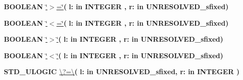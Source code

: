 \begin{DoxyCompactItemize}
\item 
{\bfseries {\bfseries \textcolor{comment}{B\+O\+O\+L\+E\+A\+N}\textcolor{vhdlchar}{ }}} \hyperlink{classfixed__pkg_a4cd07e388cdbb3996dd11f56781d3758}{\char`\"{}$>$=\char`\"{}}{\bfseries  ( }{\bfseries \textcolor{vhdlchar}{l\+: }\textcolor{stringliteral}{in }{\bfseries \textcolor{comment}{I\+N\+T\+E\+G\+E\+R}\textcolor{vhdlchar}{ }}}{\bfseries  , \textcolor{vhdlchar}{r\+: }\textcolor{stringliteral}{in }\textcolor{vhdlchar}{U\+N\+R\+E\+S\+O\+L\+V\+E\+D\+\_\+sfixed}}{\bfseries  )} 
\item 
{\bfseries {\bfseries \textcolor{comment}{B\+O\+O\+L\+E\+A\+N}\textcolor{vhdlchar}{ }}} \hyperlink{classfixed__pkg_a65b73a94d4fe541a941f431175b342b7}{\char`\"{}$<$=\char`\"{}}{\bfseries  ( }{\bfseries \textcolor{vhdlchar}{l\+: }\textcolor{stringliteral}{in }{\bfseries \textcolor{comment}{I\+N\+T\+E\+G\+E\+R}\textcolor{vhdlchar}{ }}}{\bfseries  , \textcolor{vhdlchar}{r\+: }\textcolor{stringliteral}{in }\textcolor{vhdlchar}{U\+N\+R\+E\+S\+O\+L\+V\+E\+D\+\_\+sfixed}}{\bfseries  )} 
\item 
{\bfseries {\bfseries \textcolor{comment}{B\+O\+O\+L\+E\+A\+N}\textcolor{vhdlchar}{ }}} \hyperlink{classfixed__pkg_ac6c82329bf849852be997a3d0a737cf9}{\char`\"{}$>$\char`\"{}}{\bfseries  ( }{\bfseries \textcolor{vhdlchar}{l\+: }\textcolor{stringliteral}{in }{\bfseries \textcolor{comment}{I\+N\+T\+E\+G\+E\+R}\textcolor{vhdlchar}{ }}}{\bfseries  , \textcolor{vhdlchar}{r\+: }\textcolor{stringliteral}{in }\textcolor{vhdlchar}{U\+N\+R\+E\+S\+O\+L\+V\+E\+D\+\_\+sfixed}}{\bfseries  )} 
\item 
{\bfseries {\bfseries \textcolor{comment}{B\+O\+O\+L\+E\+A\+N}\textcolor{vhdlchar}{ }}} \hyperlink{classfixed__pkg_a5d059cf3277e3585e4f3f076db10b273}{\char`\"{}$<$\char`\"{}}{\bfseries  ( }{\bfseries \textcolor{vhdlchar}{l\+: }\textcolor{stringliteral}{in }{\bfseries \textcolor{comment}{I\+N\+T\+E\+G\+E\+R}\textcolor{vhdlchar}{ }}}{\bfseries  , \textcolor{vhdlchar}{r\+: }\textcolor{stringliteral}{in }\textcolor{vhdlchar}{U\+N\+R\+E\+S\+O\+L\+V\+E\+D\+\_\+sfixed}}{\bfseries  )} 
\item 
{\bfseries {\bfseries \textcolor{comment}{S\+T\+D\+\_\+\+U\+L\+O\+G\+I\+C}\textcolor{vhdlchar}{ }}} \hyperlink{classfixed__pkg_a69151531d87456d952c2073704fa1779}{\textbackslash{}?=\textbackslash{}}{\bfseries  ( }{\bfseries \textcolor{vhdlchar}{l\+: }\textcolor{stringliteral}{in }\textcolor{vhdlchar}{U\+N\+R\+E\+S\+O\+L\+V\+E\+D\+\_\+sfixed}}{\bfseries  , \textcolor{vhdlchar}{r\+: }\textcolor{stringliteral}{in }{\bfseries \textcolor{comment}{I\+N\+T\+E\+G\+E\+R}\textcolor{vhdlchar}{ }}}{\bfseries  )} 

\end{DoxyCompactItemize}
